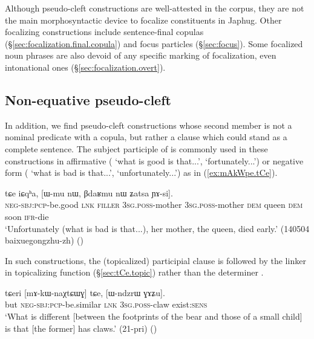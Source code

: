 Although pseudo-cleft constructions are well-attested in the corpus, they are not the main morphosyntactic device to focalize constituents in Japhug. Other focalizing constructions include sentence-final copulas (§\ref{sec:focalization.final.copula}) and focus particles (§\ref{sec:focus}). Some focalized noun phrases are also devoid of any specific marking of focalization, even intonational ones (§\ref{sec:focalization.overt}).

\subsection{Non-equative pseudo-cleft} \label{sec:pseudo.cleft2}
In addition, we find pseudo-cleft constructions whose second member is not a nominal predicate with a copula, but rather a clause which could stand as a complete sentence. The subject participle of  is commonly used in these constructions in affirmative ( `what is good is that...', `fortunately...') or negative form ( `what is bad is that...', `unfortunately...') as in (\ref{ex:mAkWpe.tCe}).

\begin{exe}
\ex \label{ex:mAkWpe.tCe}
\gll   [mɤ-kɯ-pe] tɕe iɕqʰa, [ɯ-mu nɯ, βdaʁmu nɯ ʑatsa ɲɤ-si].\\
\textsc{neg}-\textsc{sbj}:\textsc{pcp}-be.good \textsc{lnk} \textsc{filler} \textsc{3sg}.\textsc{poss}-mother  \textsc{3sg}.\textsc{poss}-mother \textsc{dem} queen \textsc{dem} soon \textsc{ifr}-die \\
\glt `Unfortunately (what is bad is that...), her mother, the queen, died early.' (140504 baixuegongzhu-zh)
()
\end{exe}

In such constructions, the (topicalized) participial clause is followed by the linker  in topicalizing function (§\ref{sec:tCe.topic}) rather than the determiner .

\begin{exe}
\ex \label{ex:mAkWnaXtCWG.tCe}
\gll tɕeri [mɤ-kɯ-naχtɕɯɣ] tɕe, [ɯ-ndzrɯ ɣɤʑu].  \\
but \textsc{neg}-\textsc{sbj}:\textsc{pcp}-be.similar \textsc{lnk} \textsc{3sg}.\textsc{poss}-claw exist:\textsc{sens} \\
\glt `What is different [between the footprints of the bear and those of a small child] is that [the former] has claws.' (21-pri)
()
\end{exe}

